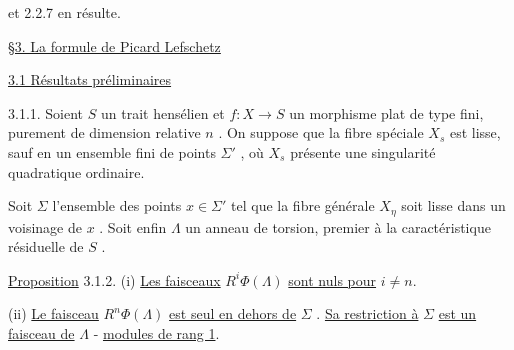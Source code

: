\begin{center}
\end{center}
et 2.2.7 en résulte.


\underline{\S3.  La formule de Picard Lefschetz}


\underline{3.1  Résultats préliminaires}

3.1.1.  Soient  $S$  un trait hensélien et  $f : X \to S$  un morphisme plat de type fini, purement de dimension relative  $n$  . On suppose que la fibre spéciale  $X_s$  est lisse, sauf en un ensemble fini de points  $\Sigma'$  , où  $X_s$  présente une singularité quadratique ordinaire.



Soit $\Sigma$ l'ensemble des points $x \in \Sigma'$ tel que la fibre générale $X_{\eta}$ soit lisse dans un voisinage de $x$ . Soit enfin $\Lambda$ un anneau de torsion, premier à la caractéristique résiduelle de $S$ .

\underline{Proposition} 3.1.2.  (i) \underline{Les faisceaux} $R^{i}\Phi(\Lambda)$ \underline{sont nuls pour} $i \neq n$.

(ii)  \underline{Le faisceau} $R^{n}\Phi(\Lambda)$ \underline{est seul en dehors de} $\Sigma$ . \underline{Sa restriction à} $\Sigma$ \underline{est un faisceau de} $\Lambda$ - \underline{modules de rang 1}.

